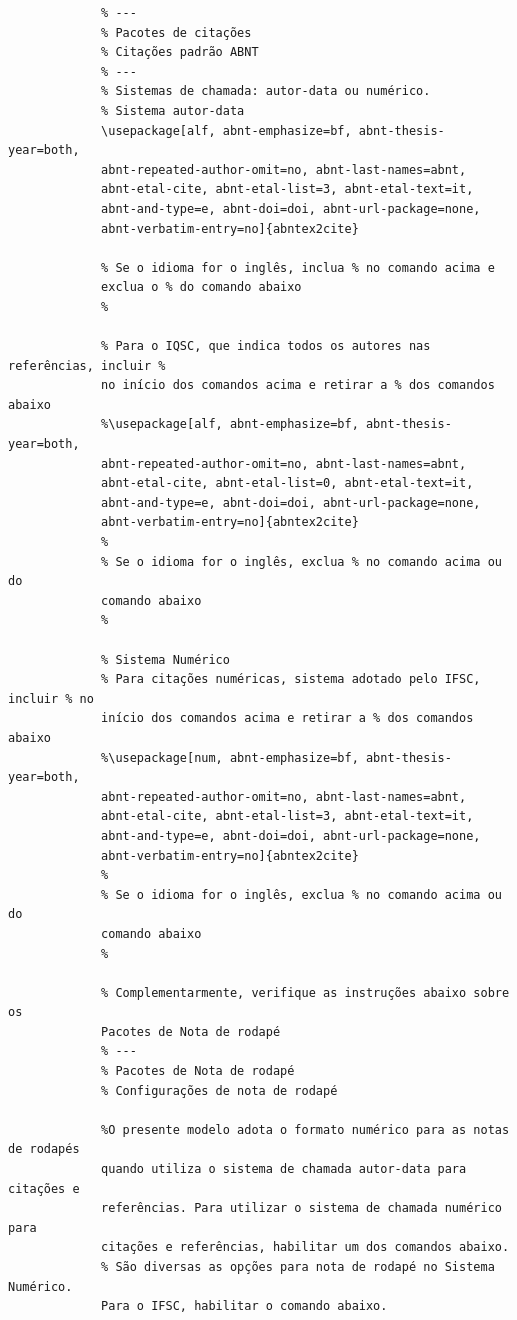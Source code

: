 			 \begin{verbatim}
			 % ---
			 % Pacotes de citações
			 % Citações padrão ABNT
			 % ---
			 % Sistemas de chamada: autor-data ou numérico.
			 % Sistema autor-data
			 \usepackage[alf, abnt-emphasize=bf, abnt-thesis-year=both,
			 abnt-repeated-author-omit=no, abnt-last-names=abnt,
			 abnt-etal-cite, abnt-etal-list=3, abnt-etal-text=it,
			 abnt-and-type=e, abnt-doi=doi, abnt-url-package=none,
			 abnt-verbatim-entry=no]{abntex2cite}
			 
			 % Se o idioma for o inglês, inclua % no comando acima e 
			 exclua o % do comando abaixo
			 %
			 
			 % Para o IQSC, que indica todos os autores nas referências, incluir % 
			 no início dos comandos acima e retirar a % dos comandos abaixo 
			 %\usepackage[alf, abnt-emphasize=bf, abnt-thesis-year=both,
			 abnt-repeated-author-omit=no, abnt-last-names=abnt,
			 abnt-etal-cite, abnt-etal-list=0, abnt-etal-text=it,
			 abnt-and-type=e, abnt-doi=doi, abnt-url-package=none,
			 abnt-verbatim-entry=no]{abntex2cite} 
			 %
			 % Se o idioma for o inglês, exclua % no comando acima ou do
			 comando abaixo
			 %
			 
			 % Sistema Numérico
			 % Para citações numéricas, sistema adotado pelo IFSC, incluir % no 
			 início dos comandos acima e retirar a % dos comandos abaixo
			 %\usepackage[num, abnt-emphasize=bf, abnt-thesis-year=both,
			 abnt-repeated-author-omit=no, abnt-last-names=abnt,
			 abnt-etal-cite, abnt-etal-list=3, abnt-etal-text=it,
			 abnt-and-type=e, abnt-doi=doi, abnt-url-package=none,
			 abnt-verbatim-entry=no]{abntex2cite} 
			 %
			 % Se o idioma for o inglês, exclua % no comando acima ou do
			 comando abaixo
			 %
			 
			 % Complementarmente, verifique as instruções abaixo sobre os
			 Pacotes de Nota de rodapé
			 % ---
			 % Pacotes de Nota de rodapé
			 % Configurações de nota de rodapé
			  
			 %O presente modelo adota o formato numérico para as notas de rodapés 
			 quando utiliza o sistema de chamada autor-data para citações e 
			 referências. Para utilizar o sistema de chamada numérico para 
			 citações e referências, habilitar um dos comandos abaixo.
			 % São diversas as opções para nota de rodapé no Sistema Numérico.  
			 Para o IFSC, habilitar o comando abaixo.
			  

\end{verbatim}
